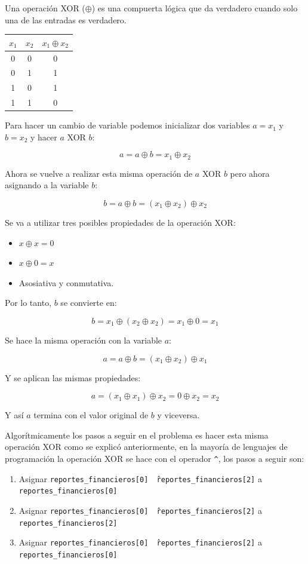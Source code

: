 \documentclass{article}
\begin{document}
Una operación XOR (\(\oplus\)) es una compuerta lógica que da verdadero cuando solo una de las entradas es verdadero. 


\begin{table}[H]
  \centering
  \begin{tabular}{|cc|c|}
    \(x_1\)&\(x_2\)& \(x_1 \oplus x_2\) \\ \hline
    0 & 0 & 0 \\
    0 & 1 & 1 \\
    1 & 0 & 1 \\
    1 & 1 & 0 
  \end{tabular}
\end{table}

Para hacer un cambio de variable podemos inicializar dos variables \(a = x_1\) y \(b = x_2\) y hacer \(a\) XOR \(b\):

\[
a = a \oplus b = x_1 \oplus x_2
\]

Ahora se vuelve a realizar esta misma operación de \(a\) XOR \(b\) pero ahora asignando a la variable \(b\):

\[
b = a \oplus b = (x_1 \oplus x_2) \oplus x_2
\]

Se va a utilizar tres posibles propiedades de la operación XOR:

\begin{itemize}
  \item \(x \oplus x = 0\) 
  \item \(x \oplus 0 = x\)
  \item Asosiativa y conmutativa.
\end{itemize}

Por lo tanto, \(b\) se convierte en:

\[
b = x_1 \oplus (x_2 \oplus x_2) = x_1 \oplus 0 = x_1 
\]

Se hace la misma operación con la variable \(a\):

\[
a = a \oplus b = (x_1 \oplus x_2) \oplus x_1
\]

Y se aplican las mismas propiedades:

\[
a = (x_1 \oplus x_1) \oplus x_2 = 0 \oplus x_2 = x_2
\]

Y así \(a\) termina con el valor original de \(b\) y viceversa.

Algorítmicamente los pasos a seguir en el problema es hacer esta misma operación XOR como se explicó anteriormente, en la mayoría de lenguajes de programación la operación XOR se hace con el operador \texttt{\^}, los pasos a seguir son:

\begin{enumerate}
  \item Asignar \texttt{reportes\_financieros[0] \^\ reportes\_financieros[2]} a \texttt{reportes\_financieros[0]}
  \item Asignar \texttt{reportes\_financieros[0] \^\ reportes\_financieros[2]} a \texttt{reportes\_financieros[2]}
  \item Asignar \texttt{reportes\_financieros[0] \^\ reportes\_financieros[2]} a \texttt{reportes\_financieros[0]}
\end{enumerate}
\end{document}
